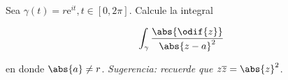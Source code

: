 \documentclass[../main.tex]{subfiles}
\begin{document}
\begin{problema}
    Sea \(\gamma(t) = r \mathrm{e}^{it}, t\in [0, 2\pi]\). Calcule la integral

    \begin{equation*}
        \int_{\gamma}^{}\dfrac{\abs{\odif{z}}}{\abs{z - a}^{2}}
    \end{equation*}

    en donde \(\abs{a} \neq r\). \emph{Sugerencia: recuerde que \(z \overline{z} =
    \abs{z}^{2}\)}.
\end{problema}
\end{document}
